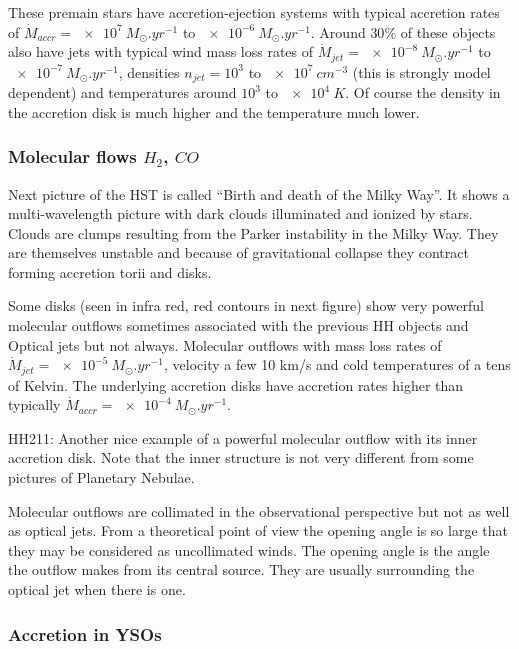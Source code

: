 \documentclass[10pt,a4paper,english,draft]{article}
\begin{document}
These premain stars have accretion-ejection systems with typical accretion
rates of $\dot{M}_{accr}=\SI{e7}{M_\odot.yr^{-1}}$ to $\SI{e-6}{M_{\odot}.yr^{-1}}$.
Around $30\%$ of these objects also have jets with typical wind mass loss rates
of $\dot{M}_{jet}=\SI{e-8}{M_{\odot}.yr^{-1}}$ to $\SI{e-7}{M_{\odot}.yr^{-1}}$, densities
$n_{jet}=10^3$ to $\SI{e7}{cm^{-3}}$ (this is strongly model dependent) and
temperatures around $10^3$ to $\SI{e4}{K}$. Of course the density in the accretion
disk is much higher and the temperature much lower.

\subsubsection{\texorpdfstring{Molecular flows $H_2$, $CO$}{Molecular flows H2, CO}}

Next picture of the HST is called ``Birth and death of the Milky Way''. It shows
a multi-wavelength picture with dark clouds illuminated and ionized by stars.
Clouds are clumps resulting from the Parker instability in the Milky Way. They
are themselves unstable and because of gravitational collapse they contract
forming accretion torii and disks.

Some disks (seen in infra red, red contours in next figure) show very powerful
molecular outflows sometimes associated with the previous HH objects and
Optical jets but not always. Molecular outflows with mass loss rates of
$\dot{M}_{jet}=\SI{e-5}{M_{\odot}.yr^{-1}}$, velocity a few 10 km/s and cold
temperatures of a tens of Kelvin. The underlying accretion disks have accretion
rates higher than typically $\dot{M}_{accr}=\SI{e-4}{M_{\odot}.yr^{-1}}$.

HH211: Another nice example of a powerful molecular outflow with its inner
accretion disk. Note that the inner structure is not very different from some
pictures of Planetary Nebulae.

Molecular outflows are collimated in the observational perspective but not as
well as optical jets. From a theoretical point of view the opening angle is so
large that they may be considered as uncollimated winds. The opening angle is
the angle the outflow makes from its central source. They are usually
surrounding the optical jet when there is one.

\subsubsection{Accretion in YSOs}
\end{document}
